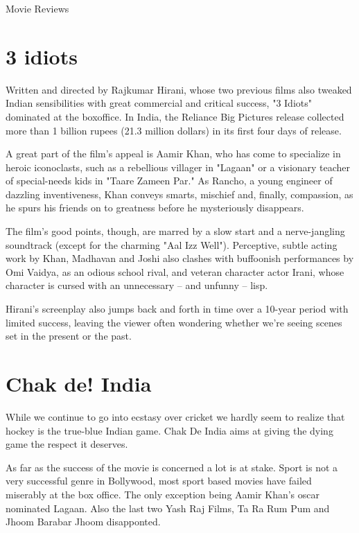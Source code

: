 \documentclass[11pt]{article}
\begin{document}
\begin{center}
\begin{Huge}
Movie Reviews
\end{Huge}
\end{center}
\section*{ 3 idiots }

Written and directed by Rajkumar Hirani, whose two previous films also tweaked Indian sensibilities with great commercial and critical success, "3 Idiots" dominated at the boxoffice. In India, the Reliance Big Pictures release collected more than 1 billion rupees (21.3 million dollars) in its first four days of release.

A great part of the film's appeal is Aamir Khan, who has come to specialize in heroic iconoclasts, such as a rebellious villager in "Lagaan" or a visionary teacher of special-needs kids in "Taare Zameen Par." As Rancho, a young engineer of dazzling inventiveness, Khan conveys smarts, mischief and, finally, compassion, as he spurs his friends on to greatness before he mysteriously disappears.

The film's good points, though, are marred by a slow start and a nerve-jangling soundtrack (except for the charming "Aal Izz Well"). Perceptive, subtle acting work by Khan, Madhavan and Joshi also clashes with buffoonish performances by Omi Vaidya, as an odious school rival, and veteran character actor Irani, whose character is cursed with an unnecessary -- and unfunny -- lisp.


Hirani's screenplay also jumps back and forth in time over a 10-year period with limited success, leaving the viewer often wondering whether we're seeing scenes set in the present or the past.



\section*{ Chak de! India}
While we continue to go into ecstasy over cricket we hardly seem to realize that hockey is the true-blue Indian game. Chak De India aims at giving the dying game the respect it deserves.

As far as the success of the movie is concerned a lot is at stake. Sport is not a very successful genre in Bollywood, most sport based movies have failed miserably at the box office. The only exception being Aamir Khan’s oscar nominated Lagaan. Also the last two Yash Raj Films, Ta Ra Rum Pum and Jhoom Barabar Jhoom disapponted.
\end{document}
